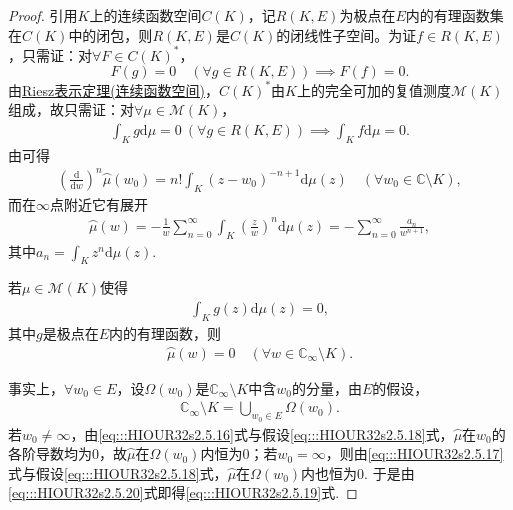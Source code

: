\documentclass[../../main.tex]{subfiles}%
\begin{document}
\begin{proof}

引用$K$上的连续函数空间$C(K)$，记$R(K,E)$为极点在$E$内的有理函数集在$C(K)$中的闭包，则$R(K,E)$是$C(K)$的闭线性子空间。为证$f\in R(K,E)$，只需证：对$\forall F\in C(K)^*$，
\[
F(g)=0\quad (\forall g\in R(K,E))\implies F(f)=0.
\]
由\hyperref[theorem:泛函分析--Riesz表示定理连续函数空间]{Riesz表示定理(连续函数空间)}，$C(K)^*$由$K$上的完全可加的复值测度$\mathscr{M}(K)$组成，故只需证：对$\forall \mu\in\mathscr{M}(K)$，
\begin{align}
\int_{K}g\mathrm{d}\mu=0\ (\forall g\in R(K,E))\implies \int_{K}f\mathrm{d}\mu=0. \label{eq:::HIOUR32s2.5.15}
\end{align}
由可得
\begin{align}
\left(\frac{\mathrm{d}}{\mathrm{d}w}\right)^n\wideparen{\mu}(w_0)=n!\int_{K}(z-w_0)^{-n+1}\mathrm{d}\mu(z)\quad (\forall w_0\in\mathbb{C}\setminus K), \label{eq:::HIOUR32s2.5.16}
\end{align}
而在$\infty$点附近它有展开
\begin{align}
\wideparen{\mu}(w)=-\frac{1}{w}\sum\limits_{n=0}^{\infty}\int_{K}\left(\frac{z}{w}\right)^n\mathrm{d}\mu(z)=-\sum\limits_{n=0}^{\infty}\frac{a_n}{w^{n+1}}, \label{eq:::HIOUR32s2.5.17}
\end{align}
其中$a_n=\int_{K}z^n\mathrm{d}\mu(z)$.

若$\mu\in\mathscr{M}(K)$使得
\begin{align}
\int_{K}g(z)\mathrm{d}\mu(z)=0, \label{eq:::HIOUR32s2.5.18}
\end{align}
其中$g$是极点在$E$内的有理函数，则
\begin{align}
\wideparen{\mu}(w)=0\quad (\forall w\in\mathbb{C}_\infty\setminus K). \label{eq:::HIOUR32s2.5.19}
\end{align}

事实上，$\forall w_0\in E$，设$\Omega(w_0)$是$\mathbb{C}_\infty\setminus K$中含$w_0$的分量，由$E$的假设，
\begin{align}
\mathbb{C}_\infty\setminus K=\bigcup\limits_{w_0\in E}\Omega(w_0). \label{eq:::HIOUR32s2.5.20}
\end{align}
若$w_0\neq\infty$，由\eqref{eq:::HIOUR32s2.5.16}式与假设\eqref{eq:::HIOUR32s2.5.18}式，$\wideparen{\mu}$在$w_0$的各阶导数均为$0$，故$\wideparen{\mu}$在$\Omega(w_0)$内恒为$0$；若$w_0=\infty$，则由\eqref{eq:::HIOUR32s2.5.17}式与假设\eqref{eq:::HIOUR32s2.5.18}式，$\wideparen{\mu}$在$\Omega(w_0)$内也恒为$0$. 于是由\eqref{eq:::HIOUR32s2.5.20}式即得\eqref{eq:::HIOUR32s2.5.19}式.


\end{proof}
\end{document}
